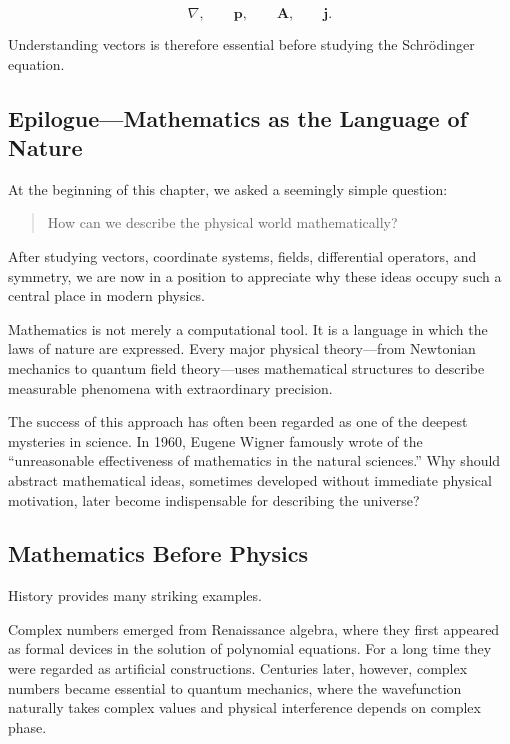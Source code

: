 \[
\nabla,
\qquad
\mathbf p,
\qquad
\mathbf A,
\qquad
\mathbf j.
\]

Understanding vectors is therefore essential before studying the Schrödinger equation.


\subsection{Epilogue---Mathematics as the Language of Nature}
\label{sec:chapter1-epilogue}

At the beginning of this chapter, we asked a seemingly simple question:

\begin{quote}
How can we describe the physical world mathematically?
\end{quote}

After studying vectors, coordinate systems, fields, differential operators, and
symmetry, we are now in a position to appreciate why these ideas occupy such a
central place in modern physics.

Mathematics is not merely a computational tool. It is a language in which the
laws of nature are expressed. Every major physical theory---from Newtonian
mechanics to quantum field theory---uses mathematical structures to describe
measurable phenomena with extraordinary precision.

The success of this approach has often been regarded as one of the deepest
mysteries in science. In 1960, Eugene Wigner famously wrote of the
``unreasonable effectiveness of mathematics in the natural sciences.'' Why
should abstract mathematical ideas, sometimes developed without immediate
physical motivation, later become indispensable for describing the universe?

\subsection{Mathematics Before Physics}

History provides many striking examples.

Complex numbers emerged from Renaissance algebra, where they first appeared as
formal devices in the solution of polynomial equations. For a long time they
were regarded as artificial constructions. Centuries later, however, complex
numbers became essential to quantum mechanics, where the wavefunction naturally
takes complex values and physical interference depends on complex phase.

